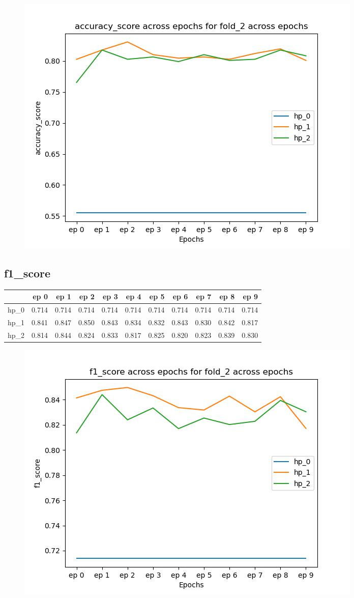 \documentclass{article}
\begin{document}
\begin{figure}[H]
\includegraphics[scale = 0.75]{fold_2/accuracy_score}
\end{figure}
\subsection{f1\_score}
\begin{tabular}{lrrrrrrrrrr}
\toprule
{} &   ep 0 &   ep 1 &   ep 2 &   ep 3 &   ep 4 &   ep 5 &   ep 6 &   ep 7 &   ep 8 &   ep 9 \\
\midrule
hp\_0 &  0.714 &  0.714 &  0.714 &  0.714 &  0.714 &  0.714 &  0.714 &  0.714 &  0.714 &  0.714 \\
hp\_1 &  0.841 &  0.847 &  0.850 &  0.843 &  0.834 &  0.832 &  0.843 &  0.830 &  0.842 &  0.817 \\
hp\_2 &  0.814 &  0.844 &  0.824 &  0.833 &  0.817 &  0.825 &  0.820 &  0.823 &  0.839 &  0.830 \\
\bottomrule
\end{tabular}

\begin{figure}[H]
\includegraphics[scale = 0.75]{fold_2/f1_score}
\end{figure}
\end{document}
